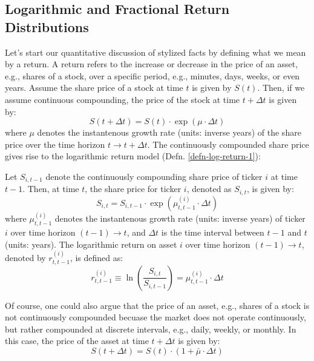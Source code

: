 \documentclass[11pt]{article}
\theoremstyle{definition}
\begin{document}
\subsection{Logarithmic and Fractional Return Distributions}\label{sec:logarithmic-and-fractional-returns}
Let's start our quantitative discussion of stylized facts by defining what we mean by a return.
A return refers to the increase or decrease in the price of an asset, e.g., shares of a stock, over a specific period, e.g., minutes, days, weeks, or even years. 
Assume the share price of a stock at time $t$ is given by $S(t)$. Then, if we assume continuous compounding, the price of the stock at time $t+\Delta{t}$ is given by:
\begin{equation}
    S(t+\Delta{t}) = S(t)\cdot\exp\left(\mu\cdot{\Delta{t}}\right)
\end{equation}
where $\mu$ denotes the instantenous growth rate (units: inverse years) of the share price over the time horizon $t\rightarrow{t+\Delta{t}}$. 
The continuously compounded share price gives rise to the logarithmic return model (Defn. \ref{defn-log-return-1}):
\begin{definition}\label{defn-log-return-1}
Let $S_{i,t-1}$ denote the continuously compounding share price of ticker $i$ at time $t-1$. Then, at time $t$, the share price for ticker $i$, denoted as $S_{i,t}$,
is given by:
\begin{equation}
    S_{i,t} = S_{i,t-1}\cdot\exp\left(\mu^{(i)}_{t,t-1}\cdot{\Delta{t}}\right)
\end{equation}
where $\mu^{(i)}_{t,t-1}$ denotes the instantenous growth rate (units: inverse years) of ticker $i$ over time horizon $(t-1)\rightarrow{t}$, 
and $\Delta{t}$ is the time interval between $t-1$ and $t$ (units: years). The logarithmic return on asset $i$ over time horizon $(t-1)\rightarrow{t}$, 
denoted by $r^{(i)}_{t,t-1}$, is defined as:
\begin{equation}
r^{(i)}_{t,t-1} \equiv \ln\left(\frac{S_{i,t}}{S_{i,t-1}}\right) = \mu^{(i)}_{t,t-1}\cdot{\Delta{t}}
\end{equation} 
\end{definition}
Of course, one could also argue that the price of an asset, e.g., shares of a stock is not continuously compounded becuase the market does not operate continuously, 
but rather compounded at discrete intervals, e.g., daily, weekly, or monthly.
In this case, the price of the asset at time $t+\Delta{t}$ is given by:
\begin{equation}
    S(t+\Delta{t}) = S(t)\cdot\left(1+\bar{\mu}\cdot{\Delta{t}}\right)
\end{equation}
\end{document}

